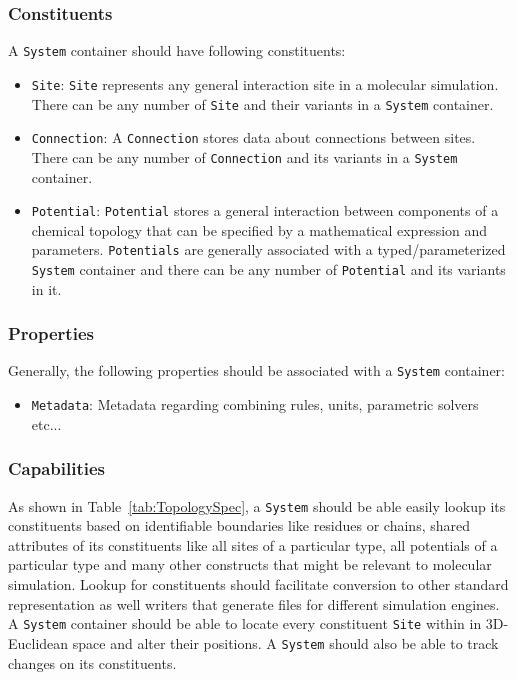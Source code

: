 \documentclass[12pt]{article}
\begin{document}
\subsubsection{Constituents}
A \texttt{System} container should have following constituents:
\begin{itemize}
    \item \texttt{Site}: \texttt{Site} represents any general interaction site in a molecular simulation. There can be any number of \texttt{Site} and their variants in a \texttt{System} container.

    \item \texttt{Connection}: A \texttt{Connection} stores data about connections between sites. There can be any number of \texttt{Connection} and its variants in a \texttt{System} container.

    \item \texttt{Potential}: \texttt{Potential} stores a general interaction between components of a chemical topology that can be specified by a mathematical expression and parameters. \texttt{Potentials} are generally associated with a typed/parameterized \texttt{System} container and there can be any number of \texttt{Potential} and its variants in it.
\end{itemize}

\subsubsection{Properties}
Generally, the following properties should be associated with a \texttt{System} container:

\begin{itemize}
    \item \texttt{Metadata}: Metadata regarding combining rules, units, parametric solvers etc...
\end{itemize}

\subsubsection{Capabilities}
As shown in Table~\ref{tab:TopologySpec}, a \texttt{System} should be able easily lookup its constituents based on identifiable boundaries like residues or chains, shared attributes of its constituents like all sites of a particular type, all potentials of a particular type and many other constructs that might be relevant to molecular simulation. Lookup for constituents should facilitate conversion to other standard representation as well writers that generate files for different simulation engines. A \texttt{System} container should be able to locate every constituent \texttt{Site} within in 3D-Euclidean space and alter their positions. A \texttt{System} should also be able to track changes on its constituents.
\end{document}
